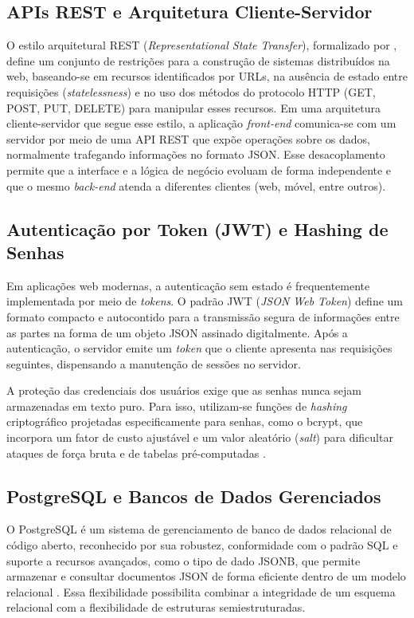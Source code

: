 \documentclass[
	12pt,
	openright,
	oneside,
	a4paper,
	chapter=TITLE,
	section=TITLE,
	subsection=TITLE,
	subsubsection=TITLE,
	english,
	brazil
	]{abntex2}
\begin{document}
\subsection{APIs REST e Arquitetura Cliente-Servidor}

O estilo arquitetural REST (\textit{Representational State Transfer}), formalizado por , define um conjunto de restrições para a construção de sistemas distribuídos na web, baseando-se em recursos identificados por URLs, na ausência de estado entre requisições (\textit{statelessness}) e no uso dos métodos do protocolo HTTP (GET, POST, PUT, DELETE) para manipular esses recursos. Em uma arquitetura cliente-servidor que segue esse estilo, a aplicação \textit{front-end} comunica-se com um servidor por meio de uma API REST que expõe operações sobre os dados, normalmente trafegando informações no formato JSON. Esse desacoplamento permite que a interface e a lógica de negócio evoluam de forma independente e que o mesmo \textit{back-end} atenda a diferentes clientes (web, móvel, entre outros).

\subsection{Autenticação por Token (JWT) e Hashing de Senhas}

Em aplicações web modernas, a autenticação sem estado é frequentemente implementada por meio de \textit{tokens}. O padrão JWT (\textit{JSON Web Token}) \cite{JONES2015} define um formato compacto e autocontido para a transmissão segura de informações entre as partes na forma de um objeto JSON assinado digitalmente. Após a autenticação, o servidor emite um \textit{token} que o cliente apresenta nas requisições seguintes, dispensando a manutenção de sessões no servidor.

A proteção das credenciais dos usuários exige que as senhas nunca sejam armazenadas em texto puro. Para isso, utilizam-se funções de \textit{hashing} criptográfico projetadas especificamente para senhas, como o bcrypt, que incorpora um fator de custo ajustável e um valor aleatório (\textit{salt}) para dificultar ataques de força bruta e de tabelas pré-computadas \cite{PROVOS1999}.

\subsection{PostgreSQL e Bancos de Dados Gerenciados}

O PostgreSQL é um sistema de gerenciamento de banco de dados relacional de código aberto, reconhecido por sua robustez, conformidade com o padrão SQL e suporte a recursos avançados, como o tipo de dado JSONB, que permite armazenar e consultar documentos JSON de forma eficiente dentro de um modelo relacional \cite{POSTGRESQL2024}. Essa flexibilidade possibilita combinar a integridade de um esquema relacional com a flexibilidade de estruturas semiestruturadas.
\end{document}
